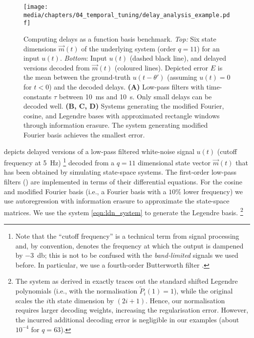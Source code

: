 \begin{figure}[t]
	\centering
	\texttt{[image: media/chapters/04\_temporal\_tuning/delay\_analysis\_example.pdf]}%
	{\label{fig:delay_analysis_example_a}}%
	{\label{fig:delay_analysis_example_b}}%
	{\label{fig:delay_analysis_example_c}}%
	{\label{fig:delay_analysis_example_d}}%
	\caption[Computing delays as a function basis benchmark]{Computing delays as a function basis benchmark.
	\emph{Top:} Six state dimensions $\vec m(t)$ of the underlying \LTI system (order $q = 11$) for an input $u(t)$.
	\emph{Bottom}: Input $u(t)$ (dashed black line), and delayed versions decoded from $\vec m(t)$ (coloured lines).
	Depicted error $E$ is the mean \NRMSE between the ground-truth $u(t - \theta')$ (assuming $u(t) = 0$ for $t < 0$) and the decoded delays.
	\textbf{(A)} Low-pass filters with time-constants $\tau$ between \SI{10}{\milli\second} and \SI{10}{\second}.
	Only small delays can be decoded well.
	\textbf{(B, C, D)} Systems generating the modified Fourier, cosine, and Legendre bases with approximated rectangle windows through information erasure.
	The system generating modified Fourier basis achieves the smallest error.
	}
	\vspace*{-1em}
	\label{fig:delay_analysis_example}
\end{figure}
 depicts delayed versions of a low-pass filtered white-noise signal $u(t)$ (cutoff frequency at \SI{5}{\hertz})%
\footnote{
Note that the \enquote{cutoff frequency} is a technical term from signal processing and, by convention, denotes the frequency at which the output is dampened by \SI{-3}{\decibel}; this is not to be confused with the \emph{band-limited} signals we used before.
In particular, we use a fourth-order Butterworth filter \citep[e.g.][Section~7.3]{oppenheim2009discretetime}.
}
decoded from a $q = 11$ dimensional state vector $\vec m(t)$ that has been obtained by simulating state-space \LTI systems.
The first-order low-pass filters () are implemented in terms of their differential equations.
For the cosine and modified Fourier basis (i.e., a Fourier basis with a $10\%$ lower frequency) we use autoregression with information erasure to approximate the \LTI state-space matrices.
We use the \LDN system \cref{eqn:ldn_system} to generate the Legendre basis.%
\footnote{The \LDN system as derived in  exactly traces out the standard shifted Legendre polynomials (i.e., with the normalisation $\tilde P_i(1) = 1$), while the original \LDN \citep{voelker2019} scales the $i$th state dimension by $(2i + 1)$.
Hence, our normalisation requires larger decoding weights, increasing the regularisation error.
However, the incurred additional decoding error is negligible in our examples (about $10^{-4}$ for $q = 63$).
}

